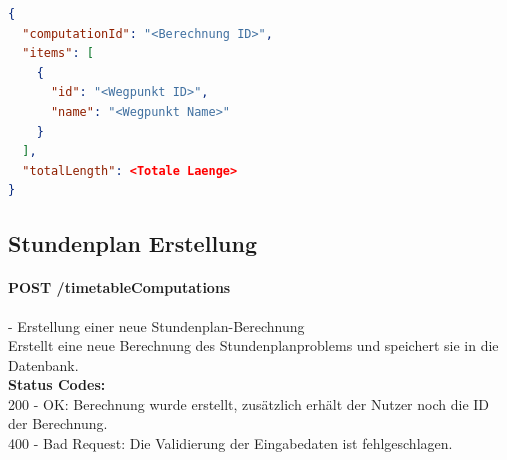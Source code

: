 \begin{lstlisting}[language=JSON, caption=Beispiel eines Endresultates für das Briefträgerproblem, label=lst:solution_postman]  
{
  "computationId": "<Berechnung ID>",
  "items": [
    {
      "id": "<Wegpunkt ID>",
      "name": "<Wegpunkt Name>"
    }
  ],
  "totalLength": <Totale Laenge>
}
\end{lstlisting}

%
%
%
%

\subsection{Stundenplan Erstellung}

\paragraph{POST /timetableComputations} - Erstellung einer neue Stundenplan-Berechnung\mbox{}\\
Erstellt eine neue Berechnung des Stundenplanproblems und speichert sie in die Datenbank.\\
\textbf{Status Codes:}\\
200 - OK: Berechnung wurde erstellt, zusätzlich erhält der Nutzer noch die ID der Berechnung.\\
400 - Bad Request: Die Validierung der Eingabedaten ist fehlgeschlagen.\\

